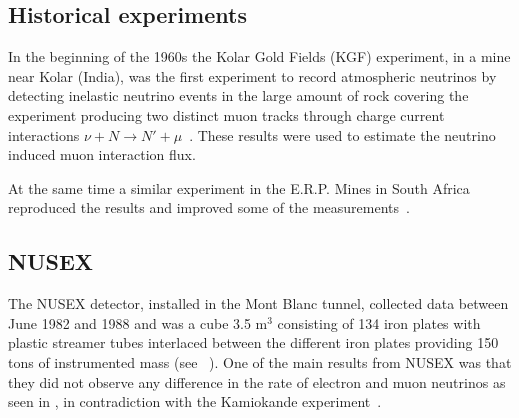 

\subsection{Historical experiments}
In the beginning of the 1960s the Kolar Gold Fields (KGF) experiment, in a mine near Kolar (India), was the first experiment to record atmospheric neutrinos by detecting inelastic neutrino events in the large amount of rock covering the experiment producing two distinct muon tracks through charge current interactions $\nu + N \rightarrow N' + \mu $~\cite{96Achar}. These results were used to estimate the neutrino induced muon interaction flux. %

At the same time a similar experiment in the E.R.P. Mines in South Africa reproduced the results and improved some of the measurements~\cite{97Reines}.

\subsection{NUSEX}
The NUSEX detector, installed in the Mont Blanc tunnel, collected data between June 1982 and 1988 and was a cube 3.5 m$^3$ consisting of 134 iron plates with plastic streamer tubes interlaced between the different iron plates providing 150 tons of instrumented mass (see ~). One of the main results from NUSEX was that they did not observe any difference in the rate of electron and muon neutrinos as seen in , in contradiction with the Kamiokande experiment~\cite{56NUSEX, 57NUSEX}.

